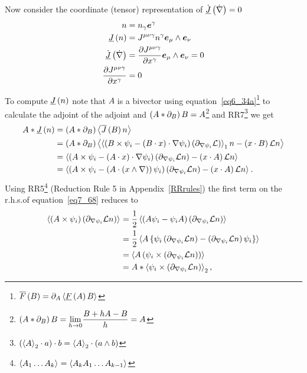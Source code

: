 Now consider the coordinate (tensor) representation of ${\dot{\underline{J}}}\left ( {\dot{\nabla}} \right ) = 0$
\begin{align}
	n &= n_{\gamma}\bm{e}^{\gamma} \\
	{\underline{J}}\left ( {n} \right ) &= J^{\mu\nu\gamma}n^{\gamma}\bm{e}_{\mu}\wedge \bm{e}_{\nu} \\
	{\dot{\underline{J}}}\left ( {\dot{\nabla}} \right ) &= \displaystyle\frac{\partial{J^{\mu\nu\gamma}}}{\partial{x^{\gamma}}}\bm{e}_{\mu}\wedge \bm{e}_{\nu} = 0 \\
	\displaystyle\frac{\partial{J^{\mu\nu\gamma}}}{\partial{x^{\gamma}}} &= 0
\end{align}

To compute ${\underline{J}}\left ( {n} \right )$ note that $A$ is a bivector using equation~\ref{eq6_34a}\footnote{${\overline{F}}\left ( {B} \right )=\partial_{A}\left \langle {{\underline{F}}\left ({A} \right )B} \right \rangle_{}$} 
to calculate the adjoint of the adjoint
and $\left ( {A*\partial_{B}} \right ) B = A$\footnote{$\left ( {A*\partial_{B}} \right ) B = {\displaystyle \lim_{h\rightarrow 0}}\displaystyle\frac{B+hA-B}{h}=A$} and 
RR7\footnote{$\left ( {\left \langle {A} \right \rangle_{2}\cdot a} \right )\cdot b = \left \langle {A} \right \rangle_{2}\cdot\left ( {a\wedge b} \right )$} we get
\begin{align}
	A*{\underline{J}}\left ( {n} \right ) &= \left ( {A*\partial_{B}} \right )\left \langle {{\overline{J}}\left ({B} \right )n} \right \rangle_{} \nonumber \\
	                       &= \left ( {A*\partial_{B}} \right )\left \langle {\left \langle {\left ({B\times\psi_{i}-\left ({B\cdot x} \right )\cdot\nabla\psi_{i}} \right )\left ({\partial_{\nabla\psi_{i}}\mathcal{L}} \right )} \right \rangle_{1}n
	                          -\left ({x\cdot B} \right )\mathcal{L}n} \right \rangle_{} \nonumber \\
	                       &= \left \langle {\left ({A\times\psi_{i}-\left ({A\cdot x} \right )\cdot\nabla\psi_{i}} \right )\left ({\partial_{\nabla\psi_{i}}\mathcal{L}n} \right )-\left ({x\cdot A} \right )\mathcal{L}n} \right \rangle_{} \nonumber \\
	                       &= \left \langle {\left ({A\times\psi_{i}-\left ({A\cdot\left ({x\wedge\nabla} \right )} \right )\psi_{i}} \right )\left ({\partial_{\nabla\psi_{i}}\mathcal{L}n} \right )-\left ({x\cdot A} \right )\mathcal{L}n} \right \rangle_{}. \label{eq7_68}  
\end{align}
Using RR5\footnote{$\left \langle {A_{1}\dots A_{k}} \right \rangle_{}=\left \langle {A_{k}A_{1}\dots A_{k-1}} \right \rangle_{}$} (Reduction Rule 5 in Appendix~\ref{RRrules}) the first term on the r.h.s.\;of equation~\ref{eq7_68} reduces to
\begin{align}
	\left \langle {\left ({A\times\psi_{i}} \right )\left ({\partial_{\nabla\psi_{i}}\mathcal{L}n} \right )} \right \rangle_{} &= \displaystyle\frac{1}{2}\left \langle {\left ({A\psi_{i}-\psi_{i}A} \right )\left ({\partial_{\nabla\psi_{i}}\mathcal{L}n} \right )} \right \rangle_{} \nonumber \\
		&= \displaystyle\frac{1}{2}\left \langle {A\left \{ {\psi_{i}\left ({\partial_{\nabla\psi_{i}}\mathcal{L}n} \right )-\left ({\partial_{\nabla\psi_{i}}\mathcal{L}n} \right )\psi_{i}} \right \} } \right \rangle_{}\nonumber \\
		&= \left \langle {A\left ({\psi_{i}\times\left ({\partial_{\nabla\psi_{i}}\mathcal{L}n} \right )} \right )} \right \rangle_{} \nonumber \\
		&= A*\left \langle {\psi_{i}\times\left ({\partial_{\nabla\psi_{i}}\mathcal{L}n} \right )} \right \rangle_{2}, \label{eq7_69} 
\end{align}
